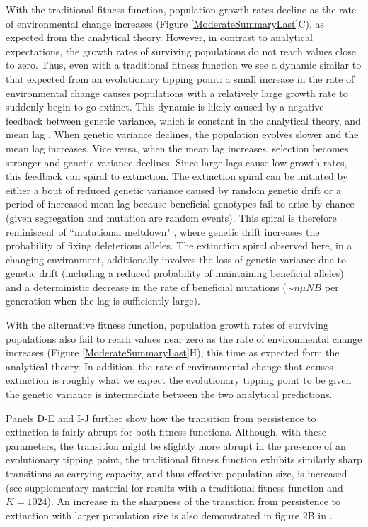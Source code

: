 \documentclass[12pt,letterpaper]{article} %
\begin{document}
With the traditional fitness function, population growth rates decline as the rate of environmental change increases (Figure \ref{ModerateSummaryLast}C), as expected from the analytical theory.
However, in contrast to analytical expectations, the growth rates of surviving populations do not reach values close to zero.
Thus, even with a traditional fitness function we see a dynamic similar to that expected from an evolutionary tipping point: a small increase in the rate of environmental change causes populations with a relatively large growth rate to suddenly begin to go extinct.
This dynamic is likely caused by a negative feedback between genetic variance, which is constant in the analytical theory, and mean lag \citep[as described in][]{Burger1995}.
When genetic variance declines, the population evolves slower and the mean lag increases.
Vice versa, when the mean lag increases, selection becomes stronger and genetic variance declines.
Since large lags cause low growth rates, this feedback can spiral to extinction.
The extinction spiral can be initiated by either a bout of reduced genetic variance caused by random genetic drift or a period of increased mean lag because beneficial genotypes fail to arise by chance (given segregation and mutation are random events).    
This spiral is therefore reminiscent of ``mutational meltdown" \citep{Lynch1990}, where genetic drift increases the probability of fixing deleterious alleles.
The extinction spiral observed here, in a changing environment, additionally involves the loss of genetic variance due to genetic drift (including a reduced probability of maintaining beneficial alleles) and a deterministic decrease in the rate of beneficial mutations ($\sim n \mu N B$ per generation when the lag is sufficiently large).

With the alternative fitness function, population growth rates of surviving populations also fail to reach values near zero as the rate of environmental change increases (Figure \ref{ModerateSummaryLast}H), this time as expected form the analytical theory.
In addition, the rate of environmental change that causes extinction is roughly what we expect the evolutionary tipping point to be given the genetic variance is intermediate between the two analytical predictions.

Panels D-E and I-J further show how the transition from persistence to extinction is fairly abrupt for both fitness functions.
Although, with these parameters, the transition might be slightly more abrupt in the presence of an evolutionary tipping point, the traditional fitness function exhibits similarly sharp transitions as carrying capacity, and thus effective population size, is increased (see supplementary material for results with a traditional fitness function and $K=1024$).
An increase in the sharpness of the transition from persistence to extinction with larger population size is also demonstrated in figure 2B in \cite{Burger1995}.
\end{document}
